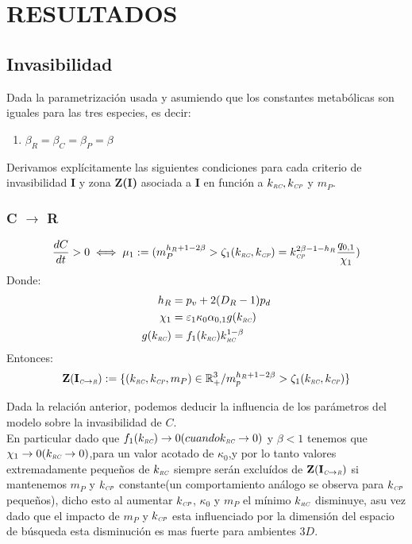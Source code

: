 \section{RESULTADOS}


\subsection{Invasibilidad}
Dada la parametrizaci\'on usada y asumiendo que los constantes metab\'olicas son iguales para las tres especies, es decir:
\begin{enumerate}
\item $\beta_R = \beta_C = \beta_P = \beta$
\end{enumerate}

Derivamos expl\'icitamente las siguientes condiciones para cada criterio de invasibilidad \textbf{I} y zona \textbf{Z(I)} asociada a \textbf{I} en funci\'on a $k_{\textit{\tiny RC}},k_{\textit{\tiny CP}}$ y $m_P$.

\subsubsection{C $\to$ R}

\begin{equation}
  \frac{dC}{dt} >0 \iff  \mu_1 := (m_P^{h_R +1 - 2\beta} > \zeta_1(k_{\textit{\tiny RC}},k_{\textit{\tiny CP}}) = k_{\textit{\tiny CP}}^{2\beta -1 -h_R}\frac{q_{0,1}}{\chi_1})
\end{equation}
Donde:
\begin{equation}
  \begin{aligned}
    h_R &= p_v + 2(D_R - 1)p_d \\
    \chi_1 &= \varepsilon_1 \kappa_0\alpha_{0,1} g(k_{\textit{\tiny RC}}) \\
    g(k_{\textit{\tiny RC}}) &= f_1(k_{\textit{\tiny RC}})k_{\textit{\tiny RC}}^{1-\beta}\\
  \end{aligned}
\end{equation}
Entonces:
\begin{equation}
\mathbf{Z(I_{\textit{\tiny C}\to \textit{\tiny R}})} := \{ (k_{\textit{\tiny RC}},k_{\textit{\tiny CP}},m_P) \in \mathbb{R}^3_+ / m_p^{h_R + 1 - 2\beta} > \zeta_1(k_{\textit{\tiny RC}},k_{\textit{\tiny CP}}) \}
\end{equation}


Dada la relaci\'on anterior, podemos deducir la influencia de los par\'ametros del modelo sobre la invasibilidad de $C$.\\

En particular dado que $f_1(k_{\textit{\tiny RC}}) \to 0 (cuando k_{\textit{\tiny RC}} \to 0)$ y $\beta <1$ tenemos que $\chi_1 \to 0 (k_{\textit{\tiny RC}} \to 0)$,para un valor acotado de $\kappa_0$,y por lo tanto valores extremadamente peque\~nos de $k_{\textit{\tiny RC}}$ siempre ser\'an exclu\'idos de $\mathbf{Z(I_{\textit{\tiny C}\to \textit{\tiny R}})}$ si mantenemos $m_P$ y $k_{\textit{\tiny CP}}$ constante(un comportamiento an\'alogo se observa para $k_{\textit{\tiny CP}}$ peque\~nos), dicho esto al aumentar $k_{\textit{\tiny CP}}$, $\kappa_0$ y $m_P$ el m\'inimo $k_{\textit{\tiny RC}}$ disminuye, asu vez dado que el impacto de $m_P$ y $k_{\textit{\tiny CP}}$ esta influenciado por la dimensi\'on del espacio de b\'usqueda esta disminuci\'on es mas fuerte para ambientes $3D$.\\

